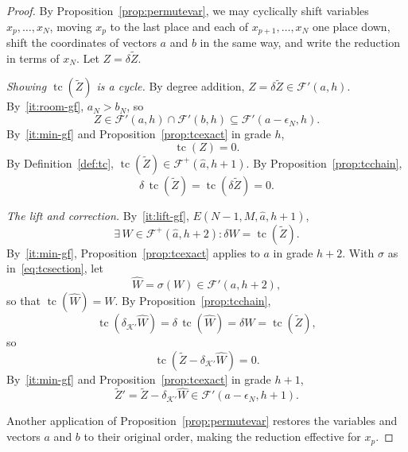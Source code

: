 \documentclass[12pt]{amsart}
\theoremstyle{definition}
\theoremstyle{remark}
\newcommand{\tc}{\operatorname{tc}}
\def\what{\hat}
\newcommand{\TZ}{\tilde Z}
\newcommand{\K}{\mathcal K}
\newcommand{\FF}{\mathcal F}
\begin{document}
\begin{proof} %
By Proposition~\ref{prop:permutevar}, we may cyclically shift variables $x_p,\ldots,x_N$,
moving $x_p$ to the last place and each of $x_{p+1},\ldots,x_N$ one place down,
shift the coordinates of vectors $a$ and $b$ in the same way,
 and write the reduction in terms of $x_N$.  
Let  $Z=\delta\TZ$.

\smallskip
\noindent\emph{Showing $\tc(\TZ)$ is a cycle.}
By degree addition, $Z=\delta\TZ\in\FF'(a,h)$.
By~\ref{it:room-gf}, $a_N > b_N$, so 
\begin{equation}\label{eq:Zlift}
Z\in\FF'(a,h)\cap\FF'(b,h) \subseteq \FF'(a-\epsilon_N,h).
\end{equation}
By~\ref{it:min-gf} and Proposition~\ref{prop:tcexact} in grade $h$,
\begin{equation}\label{eq:Zkernel}
\tc(Z) = 0.
\end{equation}
By Definition~\ref{def:tc}, $\tc(\TZ)\in \FF^+({\what a}, h+1)$.
By Proposition~\ref{prop:tcchain},
\begin{equation}\label{eq:tcTZzero}
 \delta\,\tc(\TZ)=\tc(\delta\TZ)=0.
\end{equation}

\smallskip
\noindent\emph{The lift and correction.}
By~\ref{it:lift-gf}, $E(N-1,M,{\what a},h+1)$,
\begin{equation}\label{eq:liftexist}
\exists\, W\in \FF^+({\what a}, h+2) : \delta W=\tc(\TZ).
\end{equation}
By~\ref{it:min-gf}, Proposition~\ref{prop:tcexact} applies to $a$ in grade
$h+2$.  With $\sigma$ as in~\eqref{eq:tcsection}, let 
\begin{equation}\label{eq:Wsection}
\widehat W=\sigma(W)\in\FF'(a,h+2),
\end{equation}
so that $\tc(\widehat W)=W$.
By Proposition~\ref{prop:tcchain},
\begin{equation}\label{eq:lowerleft}
\tc(\delta_{\K'}\widehat W)=\delta\,\tc(\widehat W)=\delta W=\tc(\TZ), 
\end{equation}
so
\begin{equation}\label{eq:ZdelWkernel}
\tc(\TZ - \delta_{\K'} \widehat W) = 0.
\end{equation}
By~\ref{it:min-gf}
and Proposition~\ref{prop:tcexact} in grade $h+1$,
\begin{equation}\label{eq:tzPrime}
\TZ' = \TZ-\delta_{\K'} \widehat W\in \FF'(a-\epsilon_N, h+1).
\end{equation}


Another application of Proposition~\ref{prop:permutevar} restores the variables
and vectors $a$ and $b$ to their original order, 
making the reduction effective for $x_p$.  
\end{proof}
\end{document}
